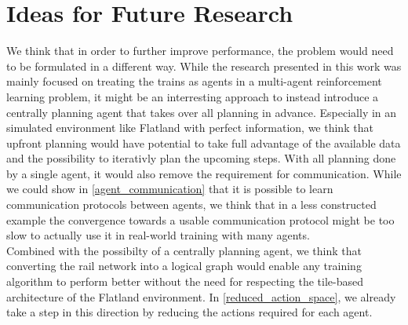 \section{Ideas for Future Research}\label{discussion_research}
We think that in order to further improve performance, the problem would need to be formulated in a different way. While the research presented in this work was mainly focused on treating the trains as agents in a multi-agent reinforcement learning problem, it might be an interresting approach to instead introduce a centrally planning agent that takes over all planning in advance. Especially in an simulated environment like Flatland with perfect information, we think that upfront planning would have potential to take full advantage of the available data and the possibility to iterativly plan the upcoming steps. With all planning done by a single agent, it would also remove the requirement for communication. While we could show in \autoref{agent_communication} that it is possible to learn communication protocols between agents, we think that in a less constructed example the convergence towards a usable communication protocol might be too slow to actually use it in real-world training with many agents.\\
Combined with the possibilty of a centrally planning agent, we think that converting the rail network into a logical graph would enable any training algorithm to perform better without the need for respecting the tile-based architecture of the Flatland environment. In \autoref{reduced_action_space}, we already take a step in this direction by reducing the actions required for each agent. 

